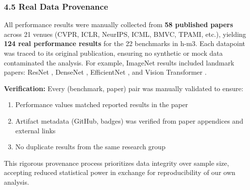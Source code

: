 \subsubsection{4.5 Real Data Provenance}

All performance results were manually collected from \textbf{58 published papers} across 21 venues (CVPR, ICLR, NeurIPS, ICML, BMVC, TPAMI, etc.), yielding \textbf{124 real performance results} for the 22 benchmarks in h-m3. Each datapoint was traced to its original publication, ensuring no synthetic or mock data contaminated the analysis. For example, ImageNet results included landmark papers: ResNet \citep{He2016}, DenseNet \citep{Huang2017}, EfficientNet \citep{Tan2019}, and Vision Transformer \citep{Dosovitskiy2020}.

\textbf{Verification:} Every (benchmark, paper) pair was manually validated to ensure:
\begin{enumerate}
\item Performance values matched reported results in the paper
\item Artifact metadata (GitHub, badges) was verified from paper appendices and external links
\item No duplicate results from the same research group
\end{enumerate}

This rigorous provenance process prioritizes data integrity over sample size, accepting reduced statistical power in exchange for reproducibility of our own analysis.

